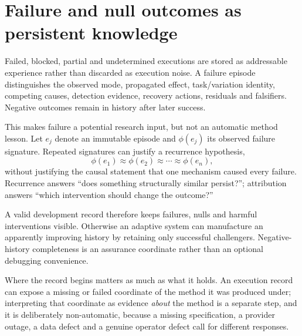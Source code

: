 \section{Failure and null outcomes as persistent knowledge}

Failed, blocked, partial and undetermined executions are stored as addressable experience rather than discarded as execution noise. A failure episode distinguishes the observed mode, propagated effect, task/variation identity, competing causes, detection evidence, recovery actions, residuals and falsifiers. Negative outcomes remain in history after later success.

This makes failure a potential research input, but not an automatic method lesson. Let $e_j$ denote an immutable episode and $\phi(e_j)$ its observed failure signature. Repeated signatures can justify a recurrence hypothesis,
\[
\phi(e_1)\approx\phi(e_2)\approx\cdots\approx\phi(e_n),
\]
without justifying the causal statement that one mechanism caused every failure. Recurrence answers ``does something structurally similar persist?''; attribution answers ``which intervention should change the outcome?''

A valid development record therefore keeps failures, nulls and harmful interventions visible. Otherwise an adaptive system can manufacture an apparently improving history by retaining only successful challengers. Negative-history completeness is an assurance coordinate rather than an optional debugging convenience.

Where the record begins matters as much as what it holds. An execution record can expose a missing or failed coordinate of the method it was produced under; interpreting that coordinate as evidence \emph{about} the method is a separate step, and it is deliberately non-automatic, because a missing specification, a provider outage, a data defect and a genuine operator defect call for different responses.
